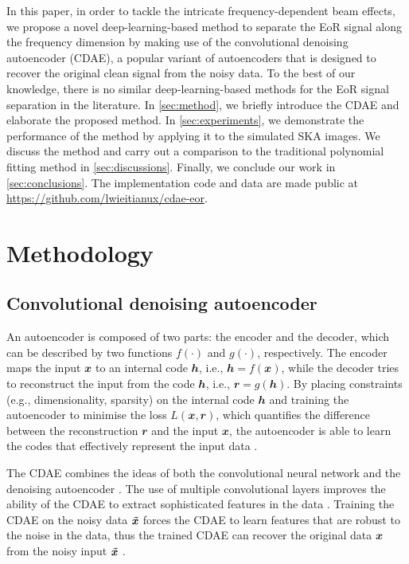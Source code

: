 \documentclass[letters,a4paper,fleqn,usenatbib]{mnras}
\newcommand{\B}[1]{\mathbfit{#1}}
\begin{document}
In this paper, in order to tackle the intricate frequency-dependent
beam effects, we propose a novel deep-learning-based method to separate
the EoR signal along the frequency dimension by making use of the
convolutional denoising autoencoder (CDAE), a popular variant of
autoencoders that is designed to recover the original clean signal
from the noisy data.
To the best of our knowledge, there is no similar deep-learning-based
methods for the EoR signal separation in the literature.
In \autoref{sec:method}, we briefly introduce the CDAE and elaborate
the proposed method.
In \autoref{sec:experiments}, we demonstrate the performance of the
method by applying it to the simulated SKA images.
We discuss the method and carry out a comparison to the traditional
polynomial fitting method in \autoref{sec:discussions}.
Finally, we conclude our work in \autoref{sec:conclusions}.
The implementation code and data are made public at
\url{https://github.com/lwieitianux/cdae-eor}.


\section{Methodology}
\label{sec:method}

\subsection{Convolutional denoising autoencoder}
\label{sec:cdae}

An autoencoder is composed of two parts: the encoder and the decoder,
which can be described by two functions $f(\cdot)$ and $g(\cdot)$,
respectively.
The encoder maps the input $\B{x}$ to an internal code $\B{h}$, i.e.,
$\B{h} = f(\B{x})$, while the decoder tries to reconstruct the input
from the code $\B{h}$, i.e., $\B{r} = g(\B{h})$.
By placing constraints (e.g., dimensionality, sparsity) on the
internal code $\B{h}$ and training the autoencoder to minimise the
loss $L(\B{x}, \B{r})$, which quantifies the difference between the
reconstruction $\B{r}$ and the input $\B{x}$, the autoencoder is able
to learn the codes that effectively represent the input data
\citep[chapter 14]{goodfellow2016}.

The CDAE combines the ideas of both the convolutional neural network
and the denoising autoencoder \citep{du2017}.
The use of multiple convolutional layers improves the ability of the
CDAE to extract sophisticated features in the data \citep{masci2011}.
Training the CDAE on the noisy data $\B{\~{x}}$ forces the CDAE to
learn features that are robust to the noise in the data, thus the
trained CDAE can recover the original data $\B{x}$ from the noisy
input $\B{\~{x}}$ \citep{vincent2008,vincent2010}.
\end{document}
